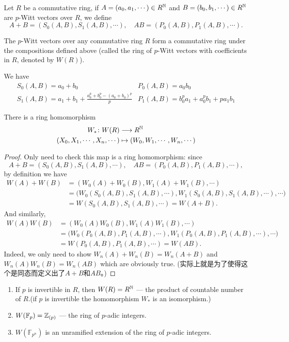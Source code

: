 Let $R$ be a commutative ring, if $A=(a_0,a_1,\cdots)\in R^{\mathbb{N}}$ and $B=(b_0,b_1,\cdots)\in R^{\mathbb{N}}$ are $p$-Witt vectors over $R$, we define
\[A+B=(S_0(A,B),  S_1(A,B),\cdots),\quad AB=(P_0(A,B),  P_1(A,B),\cdots).\]
\begin{theorem}
The $p$-Witt vectors over any commutative ring $R$ form a commutative ring under the compositions defined above (called the ring of $p$-Witt vectors with coefficients in $R$, denoted by $W(R)$).
\end{theorem}
\begin{example}
We have
\[
\begin{array}{cc}
	S_0(A,B) =a_0+b_0	& P_0(A,B)=a_0b_0\\
	S_1(A,B) =a_1+b_1+\frac{a_0^p+b_0^p-(a_0+b_0)^p}{p}	& P_1(A,B)=b_0^pa_1+a_0^pb_1+pa_1b_1
	\end{array}
\]
\end{example}
\begin{theorem}
There is a ring homomorphism
\begin{align*}
W_*\colon W(R) &\longrightarrow R^{\mathbb{N}} \\
(X_0,X_1,\cdots,X_n,\cdots)&  \mapsto (W_0,W_1,\cdots,W_n,\cdots)
\end{align*}
\end{theorem}
\begin{proof}
Only need to check this map is a ring homomorphism: since
\[A+B=(S_0(A,B),S_1(A,B),\cdots ),\quad AB=(P_0(A,B),P_1(A,B),\cdots ),\]
by definition we have
\begin{align*}
W(A)+W(B)&=(W_0(A)+W_0(B),W_1(A)+W_1(B),\cdots)\\
&=\big(W_0(S_0(A,B),S_1(A,B),\cdots ),W_1(S_0(A,B),S_1(A,B),\cdots ),\cdots\big)\\
&=W(S_0(A,B),S_1(A,B),\cdots )=W(A+B).
\end{align*}
And similarly,
\begin{align*}
W(A)W(B)&=(W_0(A)W_0(B),W_1(A)W_1(B),\cdots)\\
& =\big(W_0(P_0(A,B),P_1(A,B),\cdots ),W_1(P_0(A,B),P_1(A,B),\cdots ),\cdots\big)\\
& =W(P_0(A,B),P_1(A,B),\cdots )=W(AB).
\end{align*}
Indeed, we only need to show $W_n(A)+W_n(B)=W_n(A+B)$ and $W_n(A)W_n(B)=W_n(AB)$ which are obviously true. (实际上就是为了使得这个是同态而定义出了$A+B$和$AB$。)
\end{proof}
\begin{example}
	\begin{enumerate}
		\item If $p$ is invertible in $R$, then $W(R)=R^{\mathbb{N}}$ --- the product of countable number of $R$.(if $p$ is invertible the homomorphism $W_*$ is an
isomorphism.)
		\item $W(\mathbb{F}_p)=\mathbb{Z}_{(p)}$ --- the ring of $p$-adic integers.
		\item $W(\mathbb{F}_{p^n})$ is an unramified extension of the ring of $p$-adic integers.
	\end{enumerate}
\end{example}

